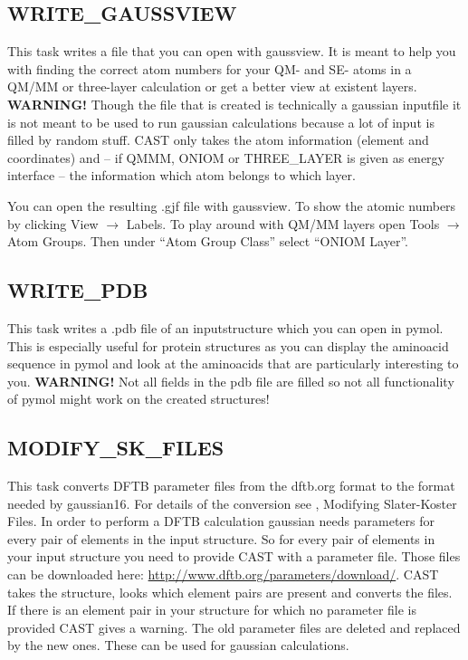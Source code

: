 \documentclass[10pt,a4paper]{article} %
\begin{document}
	\subsection{WRITE\_GAUSSVIEW}
	This task writes a file that you can open with gaussview. It is meant to help you with finding the correct atom numbers for your QM- and SE- atoms in a QM/MM or three-layer calculation or get a better view at existent layers.
	\textbf{WARNING!} Though the file that is created is technically a gaussian inputfile it is not meant to be used to run gaussian calculations because a lot of input is filled by random stuff. CAST only takes the atom information (element and coordinates) and -- if QMMM, ONIOM or THREE\_LAYER is given as energy interface -- the information which atom belongs to which layer.
	
	You can open the resulting .gjf file with gaussview. To show the atomic numbers by clicking View $\rightarrow$ Labels. To play around with QM/MM layers open Tools $\rightarrow$ Atom Groups. Then under "`Atom Group Class"' select "`ONIOM Layer"'.
	
	\subsection{WRITE\_PDB}
    This task writes a .pdb file of an inputstructure which you can open in pymol. This is especially useful for protein structures as you can display the aminoacid sequence in pymol and look at the aminoacids that are particularly interesting to you. 
    \textbf{WARNING!} Not all fields in the pdb file are filled so not all functionality of pymol might work on the created structures!
	
	\subsection{MODIFY\_SK\_FILES}
	This task converts DFTB parameter files from the dftb.org format to the format needed by gaussian16. For details of the conversion see \cite{noauthor_dftbgaussian_nodate}, Modifying Slater-Koster Files. In order to perform a DFTB calculation gaussian needs parameters for every pair of elements in the input structure. So for every pair of elements in your input structure you need to provide CAST with a parameter file. Those files can be downloaded here: \url{http://www.dftb.org/parameters/download/}. CAST takes the structure, looks which element pairs are present and converts the files. If there is an element pair in your structure for which no parameter file is provided CAST gives a warning. The old parameter files are deleted and replaced by the new ones. These can be used for gaussian calculations.
	
\end{document}
